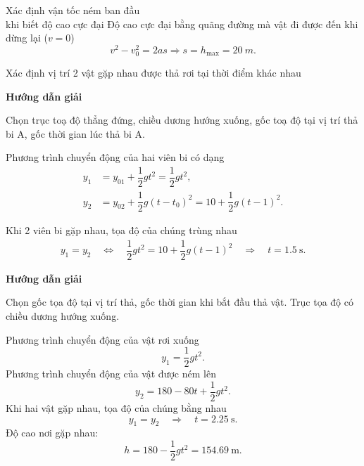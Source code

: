 \begin{dang}{Xác định vận tốc ném ban đầu \\khi biết độ cao cực đại}
{		Độ cao cực đại bằng quãng đường mà vật đi được đến khi dừng lại ($v=0$)
			$$v^2 - v_0^2=2as \Rightarrow s= h_\text{max}= \SI{20}{m}.$$
	}
\end{dang}

\begin{dang}{Xác định vị trí 2 vật gặp nhau được thả rơi tại thời điểm khác nhau}
	{	\begin{center}
			\textbf{Hướng dẫn giải}
		\end{center}
		
		Chọn trục toạ độ thẳng đứng, chiều dương hướng xuống, gốc toạ độ tại vị trí thả bi A, gốc thời gian lúc thả bi A.
		
		Phương trình chuyển động của hai viên bi có dạng
			\begin{align*}
				y_1 &= y_{01} + \dfrac{1}{2}gt^2 =\dfrac{1}{2}gt^2,\\
				y_2 &= y_{02} + \dfrac{1}{2}g(t-t_0)^2 =10+\dfrac{1}{2}g(t-1)^2.
			\end{align*}
		
		Khi 2 viên bi gặp nhau, tọa độ của chúng trùng nhau 
			\begin{align*}
				y_1=y_2 \quad\Leftrightarrow\quad \dfrac{1}{2}gt^2 =10 + \dfrac{1}{2}g(t-1)^2 \quad\Rightarrow\quad t =\SI{1,5}{\second}.
			\end{align*}
	}
	{	\begin{center}
			\textbf{Hướng dẫn giải}
		\end{center}
		
		Chọn gốc tọa độ tại vị trí thả, gốc thời gian khi bắt đầu thả vật. Trục tọa độ có chiều dương hướng xuống.
		
		Phương trình chuyển động của vật rơi xuống
			$$y_1 =\dfrac{1}{2}gt^2.$$
		Phương trình chuyển động của vật được ném lên
			$$y_2 =180 - 80t + \dfrac{1}{2}gt^2.$$
		Khi hai vật gặp nhau, tọa độ của chúng bằng nhau
			$$y_1=y_2 \quad
			\Rightarrow\quad t =\SI{2.25}{\second}.$$
		Độ cao nơi gặp nhau:
		$$h = 180 - \dfrac{1}{2}gt^2 = \SI{154,69}{\meter}.$$		
		
	}
\end{dang}